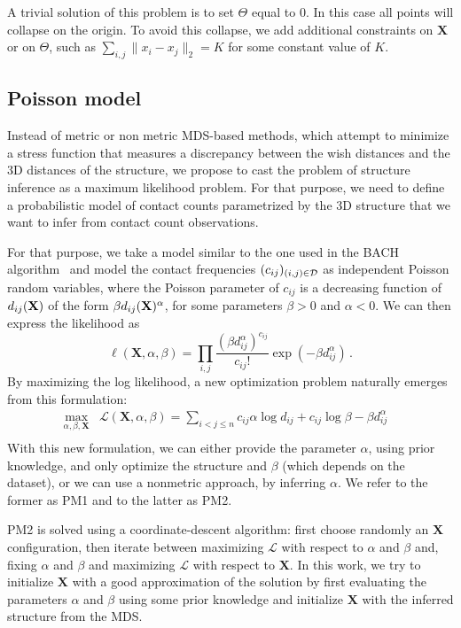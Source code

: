 A trivial solution of this problem is to set $\Theta$ equal to
$0$. In this case all points will collapse on the origin. To avoid this collapse,
we add additional constraints on $\mathbf{X}$ or on
$\Theta$, such as $\sum_{i, j} \|x_i - x_j\|_2 = K$ for some constant
value of $K$.

\subsection{Poisson model}
\label{sec:pm}

Instead of metric or non metric MDS-based methods, which attempt to minimize a stress function that measures a discrepancy between the wish distances and the 3D distances of the structure, we propose to cast the problem of structure inference as a maximum likelihood problem. For that purpose, we need to define a probabilistic model of contact counts parametrized by the 3D structure that we want to infer from contact count observations.

For that purpose, we take a model similar to the one used in the BACH algorithm~\citep{hu:bayesian} and model the contact frequencies $(c_{ij})_{(i,j)\in\mathcal{D}}$ as independent Poisson random variables, where the Poisson parameter of $c_{ij}$ is a decreasing function of $d_{ij}(\textbf{X})$ of the form $\beta d_{ij}(\textbf{X})^\alpha$, for some parameters $\beta>0$ and $\alpha<0$.
We can then express
the likelihood as
\[
\ell(\mathbf{X}, \alpha, \beta) =
  \prod_{i, j} \frac{(\beta d_{ij}^{\alpha})^{c_{ij}}}{c_{ij}!}
	\exp (- \beta d_{ij}^{\alpha})\,.
\]
By maximizing the log likelihood, a new optimization problem naturally
emerges from this formulation:
\begin{equation}
\renewcommand{\arraystretch}{2}
\begin{array}{cll}
\underset{\alpha, \beta, \textbf{X}}{\text{max}} &
\mathcal{L}(\mathbf{X}, \alpha, \beta) = \underset{i<j\leq n}{\sum}  c_{ij}
\alpha \log d_{ij} + c_{ij} \log \beta - \beta d_{ij}^\alpha &\\
\end{array}
\end{equation}
With this new formulation, we can either provide the parameter $\alpha$, using
prior knowledge, and only optimize the structure and $\beta$ (which depends on
the dataset), or we can use a nonmetric approach, by inferring $\alpha$.
We refer to the former as PM1 and to the latter as PM2.

PM2 is solved using a coordinate-descent algorithm:
first choose randomly an $\mathbf{X}$ configuration, then iterate
between maximizing $\mathcal{L}$ with respect to $\alpha$ and $\beta$
 and, fixing $\alpha$ and $\beta$ and maximizing $\mathcal{L}$
with respect to $\mathbf{X}$.  In this work, we try to
initialize $\textbf{X}$ with a good approximation of the solution by
first evaluating the parameters $\alpha$ and $\beta$ using some prior
knowledge and initialize $\textbf{X}$ with the inferred structure from
the MDS.

